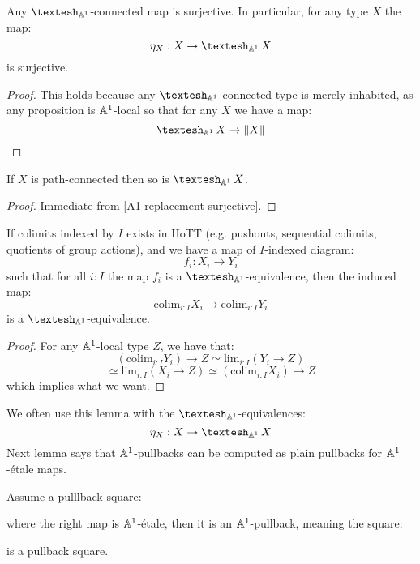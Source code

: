 \begin{lemma}\label{A1-replacement-surjective}
Any $\shape_{\A^1}$-connected map is surjective. In particular, for any type $X$ the map:
\[\eta_X:X\to \shape_{\A^1}X\]
is surjective.
\end{lemma}

\begin{proof}
This holds because any $\shape_{\A^1}$-connected type is merely inhabited, as any proposition is $\mathbb{A}^1$-local so that for any $X$ we have a map:
\[\shape_{\A^1}X \to \propTrunc{X}\]
\end{proof}

\begin{lemma}
If $X$ is path-connected then so is $\shape_{\A^1}X$.
\end{lemma}

\begin{proof}
Immediate from \cref{A1-replacement-surjective}.
\end{proof}

\begin{lemma}\label{colimit-shape}
If colimits indexed by $I$ exists in HoTT (e.g. pushouts, sequential colimits, quotients of group actions), and we have a map of $I$-indexed diagram:
\[f_i : X_i \to Y_i\]
such that for all $i:I$ the map $f_i$ is a $\shape_{\A^1}$-equivalence, then the induced map: 
\[\mathrm{colim}_{i:I} X_i \to \mathrm{colim}_{i:I} Y_i\]
is a $\shape_{\A^1}$-equivalence.
\end{lemma}

\begin{proof}
For any $\mathbb{A}^1$-local type $Z$, we have that:
\[(\mathrm{colim}_{i:I} Y_i) \to Z \simeq \mathrm{lim}_{i:I} (Y_i \to Z)\]
\[\simeq \mathrm{lim}_{i:I} (X_i \to Z) \simeq (\mathrm{colim}_{i:I} X_i) \to Z\]
which implies what we want.
\end{proof}

We often use this lemma with the $\shape_{\A^1}$-equivalences:
\[\eta_X : X \to \shape_{\A^1} X\]
Next lemma says that $\mathbb{A}^1$-pullbacks can be computed as plain pullbacks for $\mathbb{A}^1$-étale maps.

\begin{lemma}
Assume a pulllback square:
  \begin{center}
  \end{center}
  where the right map is $\mathbb{A}^1$-étale, then it is an $\mathbb{A}^1$-pullback, meaning the square:  
  \begin{center}
  \end{center}
  is a pullback square.
\end{lemma}

